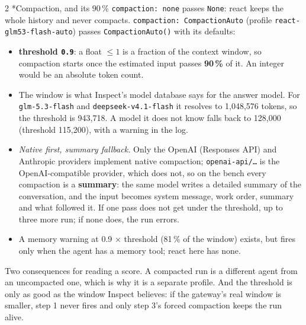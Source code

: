 \documentclass[10pt,a4paper]{article}
\makeatletter
\renewcommand\subsection{\@startsection{subsection}{2}{0pt}{8pt}{2pt}%
  {\display\bfseries\normalsize\color{ink}}}
\makeatother
\begin{document}
\begin{multicols}{2}
\subsection*{Compaction, and its 90\,\%}
\texttt{compaction: none} passes \texttt{None}: react keeps the whole
history and never compacts. \texttt{compaction: CompactionAuto}
(profile \texttt{react-glm53-flash-auto}) passes
\texttt{CompactionAuto()} with its defaults:
\begin{itemize}
\item \textbf{threshold \texttt{0.9}}: a float $\le 1$ is a fraction of
  the context window, so compaction starts once the estimated input
  passes \textbf{90\,\%} of it. An integer would be an absolute token
  count.
\item The window is what Inspect's model database says for the answer
  model. For \texttt{glm-5.3-flash} and \texttt{deepseek-v4.1-flash} it
  resolves to 1,048,576 tokens, so the threshold is 943,718. A model it
  does not know falls back to 128,000 (threshold 115,200), with a
  warning in the log.
\item \emph{Native first, summary fallback.} Only the OpenAI (Responses
  API) and Anthropic providers implement native compaction;
  \texttt{openai-api/…} is the OpenAI-compatible provider, which does
  not, so on the bench every compaction is a \textbf{summary}: the same
  model writes a detailed summary of the conversation, and the input
  becomes system message, work order, summary and what followed it. If
  one pass does not get under the threshold, up to three more run; if
  none does, the run errors.
\item A memory warning at 0.9 × threshold (81\,\% of the window) exists,
  but fires only when the agent has a memory tool; react here has none.
\end{itemize}
Two consequences for reading a score. A compacted run is a different
agent from an uncompacted one, which is why it is a separate profile.
And the threshold is only as good as the window Inspect believes: if the
gateway's real window is smaller, step 1 never fires and only step 3's
forced compaction keeps the run alive.
\end{multicols}

\clearpage
\end{document}
